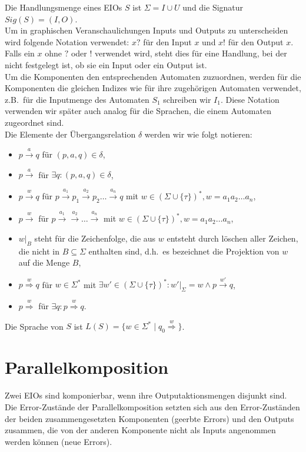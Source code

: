 Die Handlungsmenge eines EIOs $S$ ist $\Sigma = I\cup U$ und die Signatur
$Sig(S)=(I,O)$.\\
Um in graphischen Veranschaulichungen Inputs und Outputs zu unterscheiden wird
folgende Notation verwendet: $x?$ für den Input $x$ und $x!$ für den Output
$x$. Falls ein $x$ ohne $?$ oder $!$ verwendet wird, steht dies für eine
Handlung, bei der nicht festgelegt ist, ob sie ein Input oder ein Output ist.\\
Um die Komponenten den entsprechenden Automaten zuzuordnen, werden für
die Komponenten die gleichen Indizes wie für ihre zugehörigen Automaten
verwendet, z.B.\ für die Inputmenge des Automaten $S_1$ schreiben wir $I_1$.
Diese Notation verwenden wir später auch analog für die Sprachen, die einem
Automaten zugeordnet sind.\\
Die Elemente der Übergangsrelation $\delta$ werden wir wie folgt notieren:
\begin{itemize}
  \item $p\overset{a}{\rightarrow} q$ für $(p,a,q)\in\delta$,
  \item $p\overset{a}{\rightarrow}$ für $\exists q: (p,a,q)\in\delta$,
  \item $p\overset{w}{\rightarrow} q$ für $p \overset{a_1}{\rightarrow} p_1
    \overset{a_2}{\rightarrow} p_2\dots \overset{a_n}{\rightarrow} q$ mit $w\in
    (\Sigma\cup\{\tau\})^*, w=a_1a_2\dots a_n$,
  \item $p\overset{w}{\rightarrow}$ für $p \overset{a_1}{\rightarrow}
    \overset{a_2}{\rightarrow} \dots \overset{a_n}{\rightarrow}$ mit $w\in
    (\Sigma\cup\{\tau\})^*, w=a_1a_2\dots a_n$,
  \item $w|_B$ steht für die Zeichenfolge, die aus $w$ entsteht durch löschen
    aller Zeichen, die nicht in $B\subseteq\Sigma$ enthalten sind, d.h.\ es
    bezeichnet die Projektion von $w$ auf die Menge $B$,
  \item $p\overset{w}{\Rightarrow} q$ für $w\in\Sigma^*$ mit $\exists
    w'\in(\Sigma\cup\{\tau\})^*:w'|_{\Sigma}=w\wedge p\overset{w'}{\rightarrow}
    q$,
  \item $p\overset{w}{\Rightarrow}$ für $\exists q:p\overset{w}{\Rightarrow}
    q$.
\end{itemize}
Die Sprache von $S$ ist
$L(S)=\{w\in\Sigma^*\mid q_0\overset{w}{\Rightarrow}\}$.

\section{Parallelkomposition}
Zwei EIOs sind komponierbar, wenn ihre Outputaktionsmengen disjunkt sind. Die
Error-Zustände der Parallelkomposition setzten sich aus den Error-Zuständen der
beiden zusammengesetzten Komponenten (geerbte Errors) und den Outputs zusammen, die von der
anderen Komponente nicht als Inputs angenommen werden können (neue Errors).

